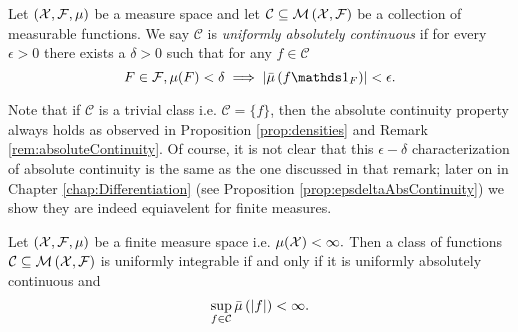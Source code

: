 \begin{defn}
\label{def:uniformAbsoluteContinuity}Let $\left(\mathcal{X},\mathcal{F},\mu\right)$
be a measure space and let $\mathcal{C}\subseteq\mathcal{M}\left(\mathcal{X},\mathcal{F}\right)$
be a collection of measurable functions. We say $\mathcal{C}$ is
\emph{uniformly absolutely continuous }if for every $\epsilon>0$
there exists a $\delta>0$ such that for any $f\in\mathcal{C}$
\[
F\in\F,\mu(F)<\delta\implies\lvert\lebInt{\mu}{f\indicate_{F}}\rvert<\epsilon.
\]
\end{defn}

\begin{rem}
\label{rem:uniformAbsoluteContinuity}Note that if $\mathcal{C}$
is a trivial class i.e. $\mathcal{C}=\{f\}$, then the absolute continuity
property always holds as observed in Proposition \ref{prop:densities}
and Remark \ref{rem:absoluteContinuity}. Of course, it is not clear
that this $\epsilon-\delta$ characterization of absolute continuity
is the same as the one discussed in that remark; later on in Chapter
\ref{chap:Differentiation} (see Proposition \ref{prop:epsdeltaAbsContinuity})
we show they are indeed equiavelent for finite measures.
\end{rem}

\begin{prop}
\label{prop:finiteMeasureUniformIntegrability}Let $\left(\mathcal{X},\mathcal{F},\mu\right)$
be a finite measure space i.e. $\mu(\mathcal{X})<\infty.$ Then a class of
functions $\mathcal{C}\subseteq\mathcal{M}\left(\mathcal{X},\mathcal{F}\right)$ is uniformly
integrable if and only if it is uniformly absolutely continuous and
\[
\sup_{f\in\mathcal{C}}\bar{\mu}\left(\lvert f\rvert\right)<\infty.
\]
\end{prop}

